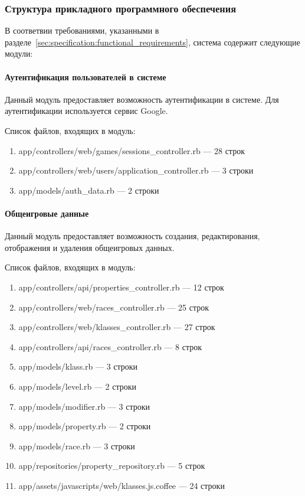 \subsubsection{Структура прикладного программного обеспечения}

В соответвии требованиями, указанными в разделе~\ref{sec:specification:functional_requirements}, система содержит следующие модули:
\paragraph{Аутентификация пользователей в системе}

Данный модуль предоставляет возможность аутентификации в системе. Для аутентификации используется сервис Google.

Список файлов, входящих в модуль:
\begin{enumerate}[label=\arabic*)]
\item app/controllers/web/games/sessions\_controller.rb --- 28 строк
\item app/controllers/web/users/application\_controller.rb --- 3 строки
\item app/models/auth\_data.rb --- 2 строки
\end{enumerate}


\paragraph{Общеигровые данные}

Данный модуль предоставляет возможность создания, редактирования, отображения и удаления общеигровых данных.

Список файлов, входящих в модуль:
\begin{enumerate}[label=\arabic*)]
\item app/controllers/api/properties\_controller.rb --- 12 строк
\item app/controllers/web/races\_controller.rb --- 25 строк
\item app/controllers/web/klasses\_controller.rb --- 27 строк
\item app/controllers/api/races\_controller.rb --- 8 строк
\item app/models/klass.rb --- 3 строки
\item app/models/level.rb --- 2 строки
\item app/models/modifier.rb --- 3 строки
\item app/models/property.rb --- 2 строки
\item app/models/race.rb --- 3 строки
\item app/repositories/property\_repository.rb --- 5 строк
\item app/assets/javascripts/web/klasses.js.coffee --- 24 строки
\end{enumerate}


